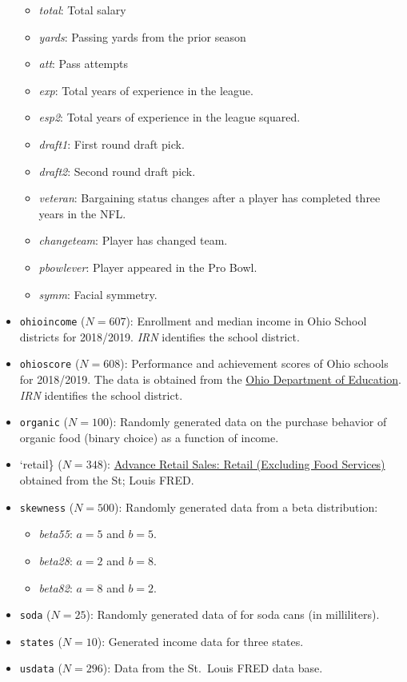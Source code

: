 \documentclass[
]{article}
\begin{document}
\begin{itemize}
  \begin{itemize}
  \item \emph{total}: Total salary
  \item \emph{yards}: Passing yards from the prior season
  \item \emph{att}: Pass attempts
  \item \emph{exp}: Total years of experience in the league.
  \item \emph{esp2}: Total years of experience in the league squared.
  \item \emph{draft1}: First round draft pick.
  \item \emph{draft2}: Second round draft pick.
  \item \emph{veteran}: Bargaining status changes after a player has completed three years in the NFL.
  \item \emph{changeteam}: Player has changed team.
  \item \emph{pbowlever}: Player appeared in the Pro Bowl.
  \item \emph{symm}: Facial symmetry.
  \end{itemize}
\item
  \texttt{ohioincome} (\(N=607\)): Enrollment and median income in Ohio School districts for 2018/2019. \emph{IRN} identifies the school district.
\item
  \texttt{ohioscore} (\(N=608\)): Performance and achievement scores of Ohio schools for 2018/2019. The data is obtained from the \href{https://reportcard.education.ohio.gov/}{Ohio Department of Education}. \emph{IRN} identifies the school district.
\item
  \texttt{organic} (\(N=100\)): Randomly generated data on the purchase behavior of organic food (binary choice) as a function of income.
\item
  `retail\} (\(N=348\)): \href{https://fred.stlouisfed.org/series/RSXFSN}{Advance Retail Sales: Retail (Excluding Food Services)} obtained from the St; Louis FRED.
\item
  \texttt{skewness} (\(N=500\)): Randomly generated data from a beta distribution:

  \begin{itemize}
  \item \emph{beta55}: $a=5$ and $b=5$.
  \item \emph{beta28}: $a=2$ and $b=8$.
  \item \emph{beta82}: $a=8$ and $b=2$.
  \end{itemize}
\item
  \texttt{soda} (\(N=25\)): Randomly generated data of for soda cans (in milliliters).
\item
  \texttt{states} (\(N=10\)): Generated income data for three states.
\item
  \texttt{usdata} (\(N=296\)): Data from the St.~Louis FRED data base.


\end{itemize}
\end{document}
